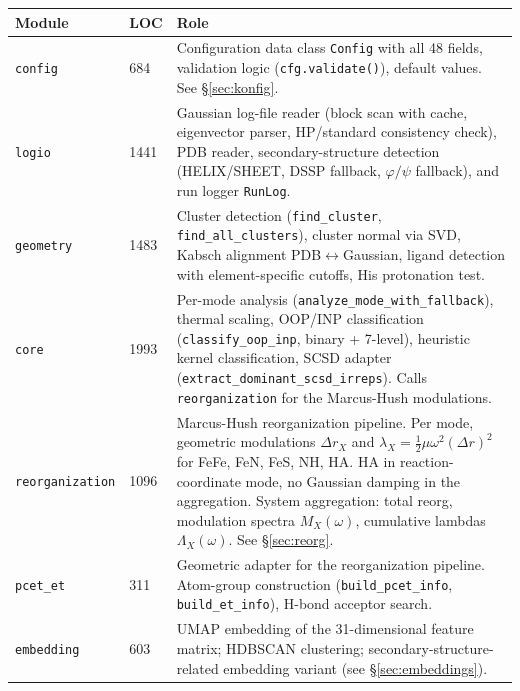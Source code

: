 \documentclass[11pt,a4paper,twoside]{article}
\theoremstyle{remark}
\begin{document}
\begin{longtable}{p{} p{} p{}}
\toprule
\textbf{Module} & \textbf{LOC} & \textbf{Role} \\
\midrule
\endhead

\texttt{config} & 684 & Configuration data class \texttt{Config}
  with all 48 fields, validation logic (\texttt{cfg.validate()}),
  default values. See \S\ref{sec:konfig}. \\

\texttt{logio} & 1441 & Gaussian log-file reader (block scan
  with cache, eigenvector parser, HP/standard consistency check),
  PDB reader, secondary-structure detection (HELIX/SHEET, DSSP
  fallback, $\varphi/\psi$ fallback), and run logger
  \texttt{RunLog}. \\

\texttt{geometry} & 1483 & Cluster detection
  (\texttt{find\_cluster}, \texttt{find\_all\_clusters}),
  cluster normal via SVD, Kabsch alignment
  PDB$\leftrightarrow$Gaussian, ligand detection with
  element-specific cutoffs, His protonation test. \\

\texttt{core} & 1993 & Per-mode analysis
  (\texttt{analyze\_mode\_with\_fallback}), thermal scaling,
  OOP/INP classification (\texttt{classify\_oop\_inp}, binary +
  7-level), heuristic kernel classification, SCSD adapter
  (\texttt{extract\_dominant\_scsd\_irreps}). Calls
  \texttt{reorganization} for the Marcus-Hush modulations. \\

\texttt{reorganization} & 1096 & Marcus-Hush reorganization
  pipeline. Per mode, geometric modulations $\Delta r_X$ and
  $\lambda_X = \tfrac{1}{2}\mu\omega^2(\Delta r)^2$ for FeFe,
  FeN, FeS, NH, HA. HA in reaction-coordinate mode, no Gaussian
  damping in the aggregation. System aggregation: total reorg,
  modulation spectra $M_X(\omega)$, cumulative lambdas
  $\Lambda_X(\omega)$. See \S\ref{sec:reorg}. \\

\texttt{pcet\_et} & 311 & Geometric adapter for the
  reorganization pipeline. Atom-group construction
  (\texttt{build\_pcet\_info}, \texttt{build\_et\_info}),
  H-bond acceptor search. \\

\texttt{embedding} & 603 & UMAP embedding of the 31-dimensional
  feature matrix; HDBSCAN clustering; secondary-structure-related
  embedding variant (see \S\ref{sec:embeddings}). \\


\end{longtable}
\end{document}
